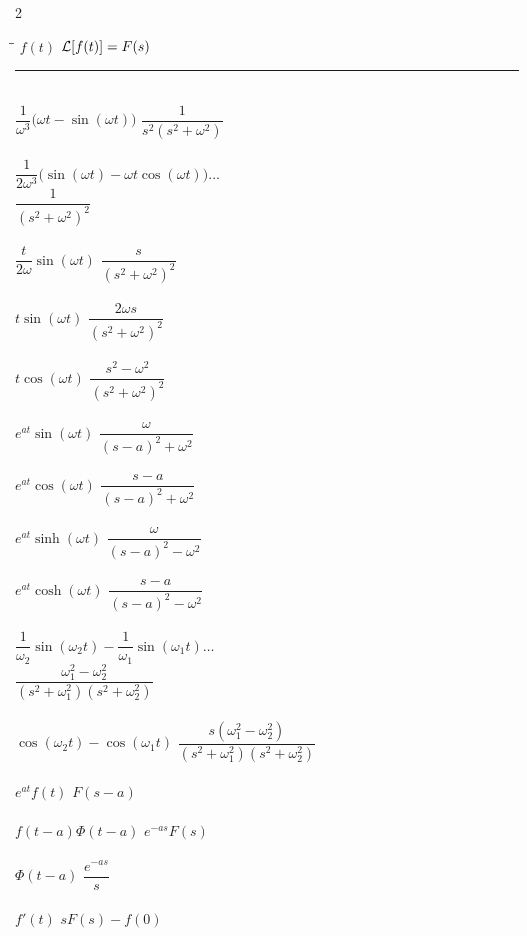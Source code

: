 \documentclass[12pt,letter]{article}
\begin{document}
{\begin{multicols}{2}
\begin{center}
\begin{tabbing}
\hspace*{1.5in}\=\hspace{1.5in}\= \kill
	$f(t)$ \> $\mathcal{L}{\left[f(t)\right]}=F(s)$ \> \\ \noindent\rule{8.0cm}{0.4pt} \\
	$\dfrac{1}{\omega^3}\big(\omega t - \sin(\omega t)\big) $	\> $\dfrac{1}{s^2(s^2+\omega^2)}$	\>\LTNUM \\ \\
	$\dfrac{1}{2\omega^3}\big(\sin(\omega t) - \omega t \cos(\omega t)\big) \dots $	\\ \> $\dfrac{1}{(s^2+\omega^2)^2}$	\>\LTNUM \\ \\
	$\dfrac{t}{2\omega} \sin(\omega t)$	 \> $\dfrac{s}{(s^2+\omega^2)^2}$	\>\LTNUM \\ \\
	$t\sin (\omega t) $  	\> $\dfrac{2\omega s}{(s^2+\omega^2)^2}$ \>\LTNUM \\ \\
	$t\cos (\omega t) $  	\> $\dfrac{s^2-\omega^2}{(s^2+\omega^2)^2}$ \>\LTNUM \\ \\
	$e^{at}\sin (\omega t) $	\> $\dfrac{\omega}{(s-a)^2+\omega^2}$  \>\LTNUM \\ \\
	$e^{at}\cos (\omega t) $	\> $\dfrac{s-a}{(s-a)^2+\omega^2}$  \>\LTNUM \\ \\
	$e^{at}\sinh (\omega t) $	\> $\dfrac{\omega}{(s-a)^2-\omega^2}$  \>\LTNUM \\ \\
	$e^{at}\cosh (\omega t) $	\> $\dfrac{s-a}{(s-a)^2-\omega^2}$  \>\LTNUM \\ \\
	$\dfrac{1}{\omega_2}\sin(\omega_2 t) - \dfrac{1}{\omega_1}\sin (\omega_1 t) \dots $	 \\ \> $\dfrac{\omega_1^2-\omega_2^2}{(s^2+\omega_1^2)(s^2+\omega_2^2)}$	\>\LTNUM \\ \\
	$\cos(\omega_2 t) - \cos (\omega_1 t)  $	\> $\dfrac{s(\omega_1^2-\omega_2^2)}{(s^2+\omega_1^2)(s^2+\omega_2^2)}$	\>\LTNUM \\ \\
	$e^{at}f(t)$	\> $F(s-a)$	\>\LTNUM \\ \\ 
	$f(t-a)\Phi(t-a)$ \> $e^{-as}F(s)$ \>\LTNUM \\ \\
	$\Phi(t-a)$ \> $\dfrac{e^{-as}}{s}$ \>\LTNUM \\ \\
	$f'(t)$ 	\> $sF(s) - f(0)$ \>\LTNUM \\ \\
\end{tabbing}
\end{center}
\end{multicols}
}
\end{document}
